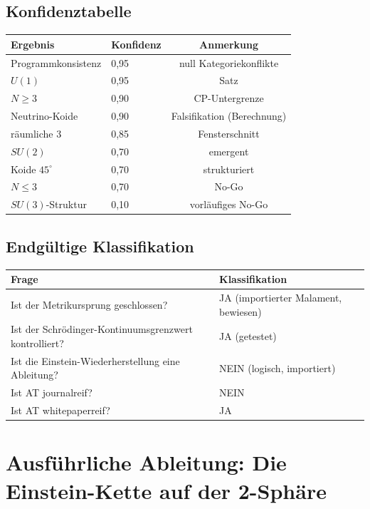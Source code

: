 \documentclass[10pt,twoside,openany]{book}
\begin{document}
\section{Konfidenztabelle}

\begin{center}
\begin{tabular}{llc}
\toprule
Ergebnis & Konfidenz & Anmerkung \\
\midrule
Programmkonsistenz & 0,95 & null Kategoriekonflikte \\
$U(1)$ & 0,95 & Satz \\
$N\ge3$ & 0,90 & CP-Untergrenze \\
Neutrino-Koide & 0,90 & Falsifikation (Berechnung) \\
räumliche 3 & 0,85 & Fensterschnitt \\
$SU(2)$ & 0,70 & emergent \\
Koide $45^\circ$ & 0,70 & strukturiert \\
$N\le3$ & 0,70 & No-Go \\
$SU(3)$-Struktur & 0,10 & vorläufiges No-Go \\
\bottomrule
\end{tabular}
\end{center}

\section{Endgültige Klassifikation}

\begin{center}
\begin{tabular}{ll}
\toprule
Frage & Klassifikation \\
\midrule
Ist der Metrikursprung geschlossen? & JA (importierter Malament, bewiesen) \\
Ist der Schr\"odinger-Kontinuumsgrenzwert kontrolliert? & JA (getestet) \\
Ist die Einstein-Wiederherstellung eine Ableitung? & NEIN (logisch, importiert) \\
Ist AT journalreif? & NEIN \\
Ist AT whitepaperreif? & JA \\
\bottomrule
\end{tabular}
\end{center}


\chapter{Ausführliche Ableitung: Die Einstein-Kette auf der 2-Sphäre}
\label{app:worked}
\end{document}
